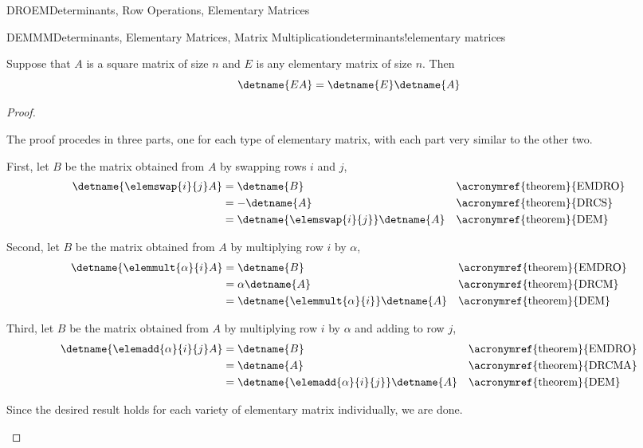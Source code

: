\begin{subsect}{DROEM}{Determinants, Row Operations, Elementary Matrices}
\begin{theorem}{DEMMM}{Determinants, Elementary Matrices, Matrix Multiplication}{determinants!elementary matrices}
\begin{para}Suppose that $A$ is a square matrix of size $n$ and $E$ is any elementary matrix of size $n$.  Then
%
\begin{equation*}
\detname{EA}=\detname{E}\detname{A}
\end{equation*}
\end{para}
%
\end{theorem}
%
\begin{proof}
\begin{para}The proof procedes in three parts, one for each type of elementary matrix, with each part very similar to the other two.\end{para}
%
\begin{para}First, let $B$ be the matrix obtained from $A$ by swapping rows $i$ and $j$,
%
\begin{align*}
\detname{\elemswap{i}{j}A}
&=\detname{B}&&\text{\acronymref{theorem}{EMDRO}}\\
&=-\detname{A}&&\text{\acronymref{theorem}{DRCS}}\\
&=\detname{\elemswap{i}{j}}\detname{A}&&\text{\acronymref{theorem}{DEM}}
\end{align*}
\end{para}
%
\begin{para}Second, let $B$ be the matrix obtained from $A$ by multiplying row $i$ by $\alpha$,
%
\begin{align*}
\detname{\elemmult{\alpha}{i}A}
&=\detname{B}&&\text{\acronymref{theorem}{EMDRO}}\\
&=\alpha\detname{A}&&\text{\acronymref{theorem}{DRCM}}\\
&=\detname{\elemmult{\alpha}{i}}\detname{A}&&\text{\acronymref{theorem}{DEM}}
\end{align*}
\end{para}
%
\begin{para}Third, let $B$ be the matrix obtained from $A$ by multiplying row $i$ by $\alpha$ and adding to row $j$,
%
\begin{align*}
\detname{\elemadd{\alpha}{i}{j}A}
&=\detname{B}&&\text{\acronymref{theorem}{EMDRO}}\\
&=\detname{A}&&\text{\acronymref{theorem}{DRCMA}}\\
&=\detname{\elemadd{\alpha}{i}{j}}\detname{A}&&\text{\acronymref{theorem}{DEM}}
\end{align*}
\end{para}
%
\begin{para}Since the desired result holds for each variety of elementary matrix individually, we are done.
\end{para}
%
\end{proof}
%
\end{subsect}
